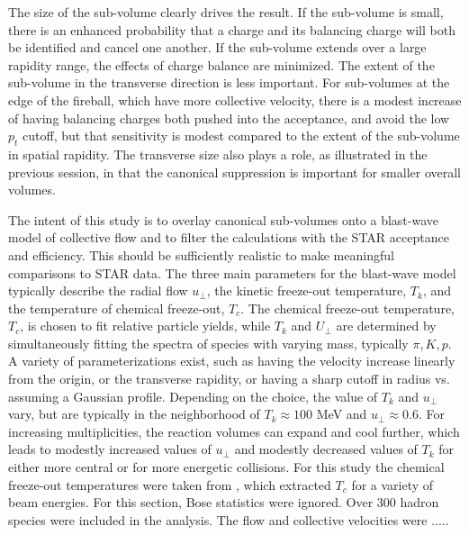 The size of the sub-volume clearly drives the result. If the sub-volume is small, there is an enhanced probability that a charge and its balancing charge will both be identified and cancel one another. If the sub-volume extends over a large rapidity range, the effects of charge balance are minimized. The extent of the sub-volume in the transverse direction is less important. For sub-volumes at the edge of the fireball, which have more collective velocity, there is a modest increase of having balancing charges both pushed into the acceptance, and avoid the low $p_t$ cutoff, but that sensitivity is modest compared to the extent of the sub-volume in spatial rapidity. The transverse size also plays a role, as illustrated in the previous session, in that the canonical suppression is important for smaller overall volumes. 

The intent of this study is to overlay canonical sub-volumes onto a blast-wave model of collective flow and to filter the calculations with the STAR acceptance and efficiency. This should be sufficiently realistic to make meaningful comparisons to STAR data. The three main parameters for the blast-wave model typically describe the radial flow $u_\perp$, the kinetic freeze-out temperature, $T_k$, and the temperature of chemical freeze-out, $T_c$. The chemical freeze-out temperature, $T_c$, is chosen to fit relative particle yields, while $T_k$ and $U_\perp$ are determined by simultaneously fitting the spectra of species with varying mass, typically $\pi,K,p$. A variety of parameterizations exist, such as having the velocity increase linearly from the origin, or the transverse rapidity, or having a sharp cutoff in radius vs. assuming a Gaussian profile. Depending on the choice, the value of $T_k$ and $u_\perp$ vary, but are typically in the neighborhood of $T_k\approx 100$ MeV and $u_\perp\approx 0.6$. For increasing multiplicities, the reaction volumes can expand and cool further, which leads to modestly increased values of $u_\perp$ and modestly decreased values of $T_k$ for either more central or for more energetic collisions. For this study the chemical freeze-out temperatures were taken from \cite{}, which extracted $T_c$ for a variety of beam energies. For this section, Bose statistics were ignored. Over 300 hadron species were included in the analysis. The flow and collective velocities were .....

